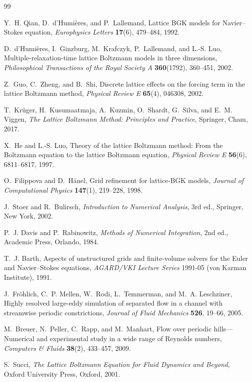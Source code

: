 \documentclass[11pt]{article}
\theoremstyle{definition}
\theoremstyle{remark}
\begin{document}
\begin{thebibliography}{99}

Y.~H. Qian, D.~d'Humi\`eres, and P.~Lallemand,
\newblock Lattice BGK models for Navier--Stokes equation,
\newblock \emph{Europhysics Letters} \textbf{17}(6), 479--484, 1992.

D.~d'Humi\`eres, I.~Ginzburg, M.~Krafczyk, P.~Lallemand, and L.-S. Luo,
\newblock Multiple-relaxation-time lattice Boltzmann models in three dimensions,
\newblock \emph{Philosophical Transactions of the Royal Society A} \textbf{360}(1792),
360--451, 2002.

Z.~Guo, C.~Zheng, and B.~Shi,
\newblock Discrete lattice effects on the forcing term in the lattice Boltzmann method,
\newblock \emph{Physical Review E} \textbf{65}(4), 046308, 2002.

T.~Kr\"uger, H.~Kusumaatmaja, A.~Kuzmin, O.~Shardt, G.~Silva, and E.~M. Viggen,
\newblock \emph{The Lattice Boltzmann Method: Principles and Practice},
\newblock Springer, Cham, 2017.

X.~He and L.-S. Luo,
\newblock Theory of the lattice Boltzmann method: From the Boltzmann equation to the
lattice Boltzmann equation,
\newblock \emph{Physical Review E} \textbf{56}(6), 6811--6817, 1997.

O.~Filippova and D.~H\"anel,
\newblock Grid refinement for lattice-BGK models,
\newblock \emph{Journal of Computational Physics} \textbf{147}(1), 219--228, 1998.

J.~Stoer and R.~Bulirsch,
\newblock \emph{Introduction to Numerical Analysis}, 3rd ed.,
\newblock Springer, New York, 2002.

P.~J. Davis and P.~Rabinowitz,
\newblock \emph{Methods of Numerical Integration}, 2nd ed.,
\newblock Academic Press, Orlando, 1984.

T.~J. Barth,
\newblock Aspects of unstructured grids and finite-volume solvers for the Euler and
Navier--Stokes equations,
\newblock \emph{AGARD/VKI Lecture Series} 1991-05 (von Karman Institute), 1991.

J.~Fr\"ohlich, C.~P. Mellen, W.~Rodi, L.~Temmerman, and M.~A. Leschziner,
\newblock Highly resolved large-eddy simulation of separated flow in a channel with
streamwise periodic constrictions,
\newblock \emph{Journal of Fluid Mechanics} \textbf{526}, 19--66, 2005.

M.~Breuer, N.~Peller, C.~Rapp, and M.~Manhart,
\newblock Flow over periodic hills---Numerical and experimental study in a wide range
of Reynolds numbers,
\newblock \emph{Computers \& Fluids} \textbf{38}(2), 433--457, 2009.

S.~Succi,
\newblock \emph{The Lattice Boltzmann Equation for Fluid Dynamics and Beyond},
\newblock Oxford University Press, Oxford, 2001.

\end{thebibliography}
\end{document}
